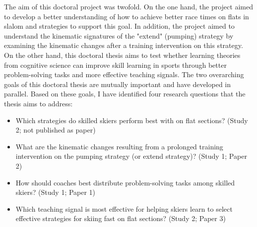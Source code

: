 The aim of this doctoral project was twofold. On the one hand, the project aimed to develop a better understanding of how to achieve better race times on flats in slalom and strategies to support this goal. In addition, the project aimed to understand the kinematic signatures of the "extend" (pumping) strategy by examining the kinematic changes after a training intervention on this strategy. On the other hand, this doctoral thesis aims to test whether learning theories from cognitive science can improve skill learning in sports through better problem-solving tasks and more effective teaching signals. The two overarching goals of this doctoral thesis are mutually important and have developed in parallel. Based on these goals, I have identified four research questions that the thesis aims to address:

\begin{itemize}
    \item Which strategies do skilled skiers perform best with on flat sections? (Study 2; not published as paper) 
    \item What are the kinematic changes resulting from a prolonged training intervention on the pumping strategy (or extend strategy)? (Study 1; Paper 2)
    \item How should coaches best distribute problem-solving tasks among skilled skiers? (Study 1; Paper 1)
    \item Which teaching signal is most effective for helping skiers learn to select effective strategies for skiing fast on flat sections?  (Study 2; Paper 3)
\end{itemize}










